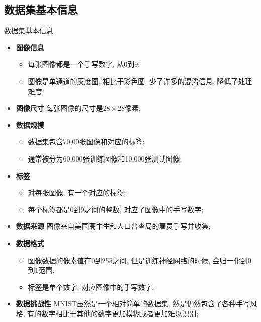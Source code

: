 \documentclass{beamer}
\begin{document}
\subsection{数据集基本信息}
\begin{frame}[fragile]{数据集基本信息}
	\begin{itemize}
		\item<only@1> \textbf{图像信息 }
			\begin{itemize}
				\item 每张图像都是一个手写数字, 从0到9;
				\item 图像是单通道的灰度图, 相比于彩色图, 少了许多的混淆信息, 降低了处理难度;
			\end{itemize}
		\item<only@1> \textbf{图像尺寸 }每张图像的尺寸是$28\times 28$像素;
		\item<only@1> \textbf{数据规模 }
			\begin{itemize}
				\item 数据集包含70,00张图像和对应的标签;
				\item 通常被分为60,000张训练图像和10,000张测试图像;
			\end{itemize}
		\item<only@2> \textbf{标签 }
			\begin{itemize}
				\item 对每张图像, 有一个对应的标签;
				\item 每个标签都是0到9之间的整数, 对应了图像中的手写数字;
			\end{itemize}
		\item<only@2> \textbf{数据来源 } 图像来自美国高中生和人口普查局的雇员手写并收集;
		\item<only@2> \textbf{数据格式 }
			\begin{itemize}
				\item 图像数据的像素值在0到255之间, 但是训练神经网络的时候, 会归一化到0到1范围;
				\item 标签是单个数字, 对应图像中的手写数字;
			\end{itemize}
		\item<only@2> \textbf{数据挑战性 }MNIST虽然是一个相对简单的数据集, 然是仍然包含了各种手写风格, 有的数字相比于其他的数字更加模糊或者更加难以识别;
	\end{itemize}


\end{frame}
\end{document}

